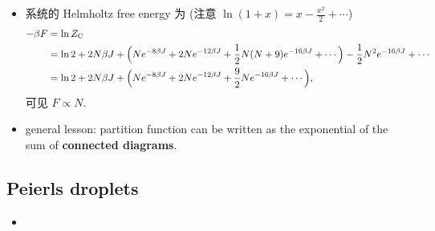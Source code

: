 \begin{itemize}
	\item 系统的 Helmholtz free energy 为 (注意 $\ln(1 + x) = x - \frac{x^2}{2} + \cdots$)
	\begin{align}
		- \beta F &= \ln Z_\text{C} \notag \\
		&= \ln 2 + 2 N \beta J + \Big( N e^{- 8 \beta J} + 2 N e^{- 12 \beta J} + \frac{1}{2} N (N + 9) e^{- 16 \beta J} + \cdots \Big) - \frac{1}{2} N^2 e^{- 16 \beta J} + \cdots \notag \\
		&= \ln 2 + 2 N \beta J + \Big( N e^{- 8 \beta J} + 2 N e^{- 12 \beta J} + \frac{9}{2} N e^{- 16 \beta J} + \cdots \Big),
	\end{align}
	可见 $F \propto N$.
	
	\item general lesson: partition function can be written as the exponential of the sum of \textbf{connected diagrams}.
\end{itemize}

\subsection{Peierls droplets}
\begin{itemize}
	\item 
\end{itemize}
